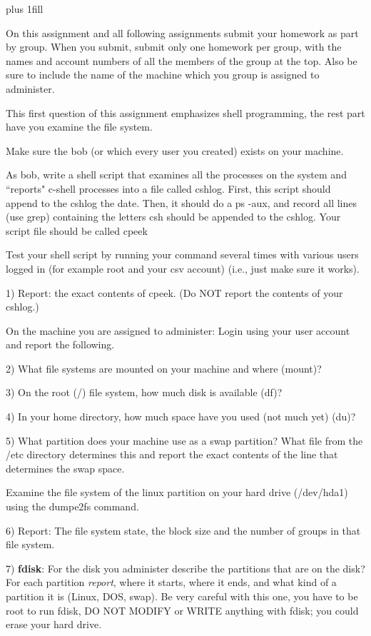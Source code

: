 
\rightskip=0pt plus 1fill

\parindent 0pt

On this assignment and all following assignments submit your homework
as part by group.
When you submit, submit only one homework per group, with the names
and account numbers of all the members of the group at the top.
Also be sure to include the name of the machine which you group
is assigned to administer.

This first question of this assignment emphasizes shell programming,
the rest part have you examine the file system.

Make sure the {\ltt{}bob} (or which every user you created) exists on your 
machine.

As bob, write a shell script that examines all the processes on the
system and ``reports" c-shell processes into a file called {\ltt{}cshlog}.
First, this script should append to the {\ltt{}cshlog} the {\ltt{}date}.
Then, it should do a {\ltt{}ps -aux}, and record all lines (use {\ltt{}grep})
containing the letters csh should be appended to the {\ltt{}cshlog}.
Your script file should be called {\ltt{}cpeek}

Test your shell script by
running your command several times with various users logged 
in (for example root and your csv account)
(i.e., just make sure it works).

1) Report: the exact contents of {\ltt{}cpeek}.
(Do NOT report the contents of your cshlog.)

On the machine you are assigned to administer:
Login using your user account and report the following.

2) What file systems are mounted on your machine and where (mount)?

3) On the root ({\ltt{}/}) file system, how much disk is available (df)?

4) In your home directory, how much space have you used (not much yet) (du)?

5) What partition does your machine use as a swap partition?
What file from the {\ltt{}/etc} directory determines this
and report the exact contents of the line that determines the swap space.

Examine the file system of the linux partition on your hard drive
({\ltt{}/dev/hda1}) using the {\ltt{}dumpe2fs} command.

6) Report: The file system state, the block size and the number of groups
in that file system.

7) {\bf fdisk}:
For the disk you administer describe the partitions that are on the disk?
For each partition {\it report}, where it starts, where it ends, and what kind
of a partition it is (Linux, DOS, swap).
Be very careful with this one, you have to be root to run fdisk,
DO NOT MODIFY or WRITE anything with fdisk; 
you could erase your hard drive.

\bye
